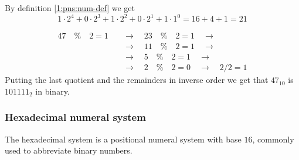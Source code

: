 \newpage
\begin{example}
    By definition \ref{1:pns:num-def} we get
    \begin{equation}
        1\cdot 2^4 + 0\cdot 2^3 + 1\cdot 2^2 + 0\cdot 2^1 + 1\cdot 1^0 = 16 + 4 + 1 = 21
    \end{equation}
\end{example}
\begin{example}
    \begin{align}
        47 \quad\%\quad 2 = 1 &\quad\rightarrow\quad 23\quad\%\quad 2 = 1 \quad\rightarrow \\
                              &\quad\rightarrow\quad 11\quad\%\quad 2 = 1 \quad\rightarrow \\
                              &\quad\rightarrow\quad 5\quad\%\quad 2 = 1 \quad\rightarrow \\
                              &\quad\rightarrow\quad 2\quad\%\quad 2 = 0 \quad\rightarrow\quad 2 / 2 = 1
    \end{align}
    Putting the last quotient and the remainders in inverse order we get that $47_{10}$ is $101111_2$ in binary.
\end{example}

\subsubsection{Hexadecimal numeral system}
\begin{definition}
    The hexadecimal system is a positional numeral system with base $16$, commonly used to abbreviate binary numbers.
\end{definition}

